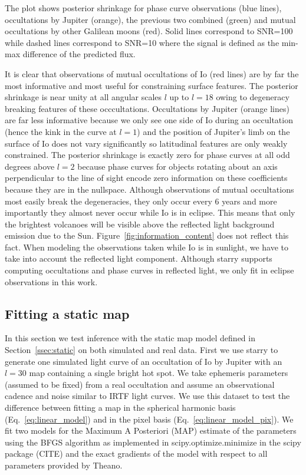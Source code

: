\documentclass[modern]{aastex62}
\begin{document}
The plot shows posterior shrinkage for phase curve observations (blue lines), occultations by Jupiter (orange), the previous two combined (green) and mutual occultations by other Galilean moons (red). 
Solid lines correspond to SNR=100 while dashed lines correspond to SNR=10 where the signal is defined as the min-max difference of the predicted flux.

        It is clear that observations of mutual occultations of Io (red lines) are by far the most informative and most useful for constraining surface features. The posterior shrinkage is near unity at all angular scales $l$ up to $l=18$ owing to degeneracy breaking features of these occcultations. 
        Occultations by Jupiter (orange lines) are far less informative because we only see one side of Io during an occultation (hence the kink in the curve at $l=1$) and the position of Jupiter's limb on the surface of Io does not vary significantly so latitudinal features are only weakly constrained.
        The posterior shrinkage is exactly zero for phase curves at all odd degrees above $l=2$ because phase curves for objects rotating about an axis perpendicular to the line of sight encode zero information on these coefficients because they are in the nullspace.
Although observations of mutual occultations most easily break the degeneracies, they only occur every 6 years and more importantly they almost never occur while Io is in eclipse.
This means that only the brightest volcanoes will be visible above the reflected light background emission due to the Sun.
Figure~\ref{fig:information_content} does not reflect this fact.
When modeling the observations taken while Io is in sunlight, we have to take into account the reflected light component.
Although \textsf{starry} supports computing occultations and phase curves in reflected light, we only fit in eclipse observations in this work.

\subsection{Fitting a static map}
\label{ssec:static_map}
In this section we test inference with the static map model defined in Section~\ref{ssec:static} on both simulated and real data.
First we use \textsf{starry} to generate one simulated light curve of an occultation of Io by Jupiter with an $l=30$ map containing a single bright hot spot.
We take ephemeris parameters (assumed to be fixed) from a real occultation and assume an observational cadence and noise similar to IRTF light curves.
We use this dataset to test the difference between fitting a map in the spherical harmonic basis (Eq.~\ref{eq:linear_model}) and in the pixel basis (Eq.~\ref{eq:linear_model_pix}).
We fit two models for the Maximum A Posteriori (MAP) estimate of the parameters using the
\textsf{BFGS} algorithm as implemented in \textsf{scipy.optimize.minimize} in the \textsf{scipy} package (CITE) and the exact gradients of the model with respect to all parameters provided by \textsf{Theano}.
\end{document}
